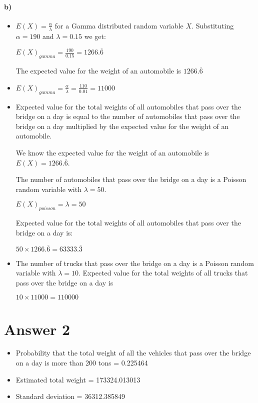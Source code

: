 \documentclass[12pt]{article}
\begin{document}
\paragraph{b)}
\begin{itemize}
    \item$E(X)  = \frac{\alpha}{\lambda}$ for a Gamma distributed random variable $X$.
Substituting $\alpha = 190$ and $\lambda = 0.15$ we get:

$E(X)_{gamma}  = \frac{190}{0.15} = 1266.\overline{6}$

The expected value for the weight of an automobile is $1266.\overline{6}$\\

\item $E(X)_{gamma} = \frac{\alpha}{\lambda} = \frac{110}{0.01} = 11000$

\item Expected value for the total weights of all automobiles that pass over the bridge on a
day is equal to the number of automobiles that pass over the bridge on a day multiplied by the expected value for the weight of an automobile.

We know the expected value for the weight of an automobile is $E(X) = 1266.\overline{6}$.

The number of automobiles that pass over the bridge on a day is a Poisson random variable with
$\lambda = 50$.

$E(X)_{poisson} = \lambda = 50$

Expected value for the total weights of all automobiles that pass over the bridge on a day is:
\begin{center}
$50 \times 1266.\overline{6} = 63333.\overline{3}$
\end{center}

\item 
The number of trucks that pass over the bridge on a day is a Poisson random variable with
$\lambda = 10$.
Expected value for the total weights of all trucks that pass over the bridge on a day is
\begin{center}
    $10 \times 11000 = 110000$
\end{center}
\end{itemize}
\section*{Answer 2}
\begin{itemize}
    \item Probability that the total weight of all the vehicles that pass over the bridge on a day is more than 200 tons = 0.225464
    \item Estimated total weight = 173324.013013
    \item Standard deviation = 36312.385849
\end{itemize}
\end{document}

